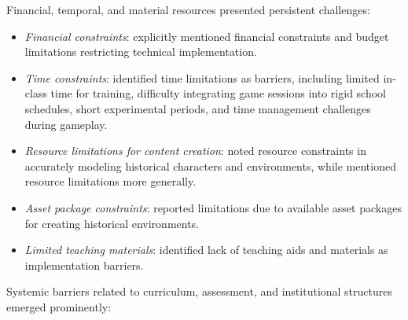 \documentclass[a4paper,fleqn]{cas-sc}
\begin{document}

Financial, temporal, and material resources presented persistent challenges:

\begin{itemize}[noitemsep]
 \item \textit{Financial constraints}: \citet{4Cruz2017} explicitly mentioned financial constraints and budget limitations restricting technical implementation.
 
 \item \textit{Time constraints}: \citet{14Forsyth2023, 20Erandaru2014, 42Huffer201581, 50Lye2013, 53Perez2014, 60Hoy2018, 64Hsu201324, 75trajano2014using} identified time limitations as barriers, including limited in-class time for training, difficulty integrating game sessions into rigid school schedules, short experimental periods, and time management challenges during gameplay.
 
 \item \textit{Resource limitations for content creation}: \citet{2Mahamarowi2023133} noted resource constraints in accurately modeling historical characters and environments, while \citet{75trajano2014using} mentioned resource limitations more generally.
 
 \item \textit{Asset package constraints}: \citet{14Forsyth2023} reported limitations due to available asset packages for creating historical environments.
 
 \item \textit{Limited teaching materials}: \citet{23Zin2009322, 38Mercik2024} identified lack of teaching aids and materials as implementation barriers.
\end{itemize}


Systemic barriers related to curriculum, assessment, and institutional structures emerged prominently:
\end{document}
